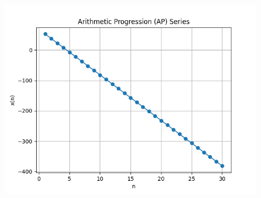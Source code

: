 \documentclass[journal,12pt,twocolumn]{IEEEtran}
\theoremstyle{remark}
\begin{document}
\begin{figure}[h]
      \vspace{-2cm}
      \centering
       \includegraphics[width=0.8\linewidth]{figures/download5.png} %
        \caption{}
\end{figure}
\end{document}
